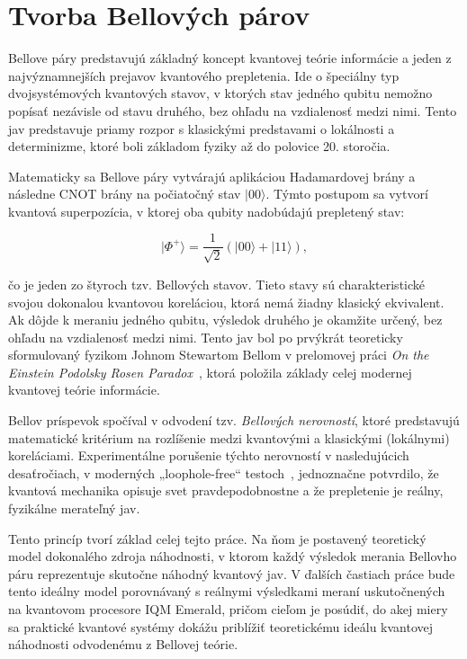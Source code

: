 \section{Tvorba Bellových párov}\label{sec:tvorba-bellovych-parov}

Bellove páry predstavujú základný koncept kvantovej teórie informácie a jeden z najvýznamnejších prejavov kvantového prepletenia. Ide o špeciálny typ dvojsystémových kvantových stavov, v ktorých stav jedného qubitu nemožno popísať nezávisle od stavu druhého, bez ohľadu na vzdialenosť medzi nimi. Tento jav predstavuje priamy rozpor s klasickými predstavami o lokálnosti a determinizme, ktoré boli základom fyziky až do polovice 20. storočia.

Matematicky sa Bellove páry vytvárajú aplikáciou Hadamardovej brány a následne CNOT brány na počiatočný stav $\lvert 00 \rangle$. Týmto postupom sa vytvorí kvantová superpozícia, v ktorej oba qubity nadobúdajú prepletený stav:

\begin{equation}
  \lvert \Phi^+ \rangle = \frac{1}{\sqrt{2}}(\lvert 00 \rangle + \lvert 11 \rangle),
  \label{eq:bell_pair_qubit_state}
\end{equation}

čo je jeden zo štyroch tzv. Bellových stavov. Tieto stavy sú charakteristické svojou dokonalou kvantovou koreláciou, ktorá nemá žiadny klasický ekvivalent. Ak dôjde k meraniu jedného qubitu, výsledok druhého je okamžite určený, bez ohľadu na vzdialenosť medzi nimi. Tento jav bol po prvýkrát teoreticky sformulovaný fyzikom Johnom Stewartom Bellom v prelomovej práci \textit{On the Einstein Podolsky Rosen Paradox}~\cite{PhysicsPhysiqueFizika.1.195}, ktorá položila základy celej modernej kvantovej teórie informácie.

Bellov príspevok spočíval v odvodení tzv. \textit{Bellových nerovností}, ktoré predstavujú matematické kritérium na rozlíšenie medzi kvantovými a klasickými (lokálnymi) koreláciami. Experimentálne porušenie týchto nerovností v nasledujúcich desaťročiach, v moderných „loophole-free“ testoch~\cite{shalm2015strong}, jednoznačne potvrdilo, že kvantová mechanika opisuje svet pravdepodobnostne a že prepletenie je reálny, fyzikálne merateľný jav.

Tento princíp tvorí základ celej tejto práce. Na ňom je postavený teoretický model dokonalého zdroja náhodnosti, v ktorom každý výsledok merania Bellovho páru reprezentuje skutočne náhodný kvantový jav. V ďalších častiach práce bude tento ideálny model porovnávaný s reálnymi výsledkami meraní uskutočnených na kvantovom procesore IQM Emerald, pričom cieľom je posúdiť, do akej miery sa praktické kvantové systémy dokážu priblížiť teoretickému ideálu kvantovej náhodnosti odvodenému z Bellovej teórie.

